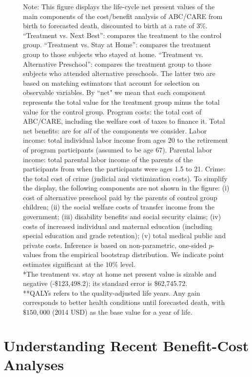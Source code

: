 \begin{figure}
\begin{subfigure}[h]{0.5\textwidth}
\end{subfigure}
\footnotesize \justify
Note: This figure displays the life-cycle net present values of the main components of the cost/benefit analysis of ABC/CARE from birth to forecasted death, discounted to birth at a rate of 3\%. ``Treatment vs. Next Best'': compares the treatment to the control group. ``Treatment vs. Stay at Home'': compares the treatment group to those subjects who stayed at home. ``Treatment vs. Alternative Preschool'': compares the treatment group to those subjects who attended alternative preschools. The latter two are based on matching estimators that account for selection on observable variables. By ``net" we mean that each component represents the total value for the treatment group minus the total value for the control group. Program costs: the total cost of ABC/CARE, including the welfare cost of taxes to finance it. Total net benefits: are for \textit{all} of the components we consider. Labor income: total individual labor income from ages 20 to the retirement of program participants (assumed to be age 67). Parental labor income: total parental labor income of the parents of the participants from when the participants were ages 1.5 to 21. Crime: the total cost of crime (judicial and victimization costs). To simplify the display, the following components are not shown in the figure: (i) cost of alternative preschool paid by the parents of control group children; (ii) the social welfare costs of transfer income from the government; (iii) disability benefits and social security claims; (iv) costs of increased individual and maternal education (including special education and grade retention); (v) total medical public and private costs. Inference is based on non-parametric, one-sided $p$-values from the empirical bootstrap distribution. We indicate point estimates significant at the $10\%$ level.\\
*The treatment vs. stay at home net present value is sizable and negative (-\$123,498.2); its standard error is \$62,745.72.\\
**QALYs refers to the quality-adjusted life years. Any gain corresponds to better health conditions until forecasted death, with $\$150,000$ (2014 USD) as the base value for a year of life.
\end{figure}

\section{Understanding Recent Benefit-Cost Analyses} \label{section:bcaestimates}

